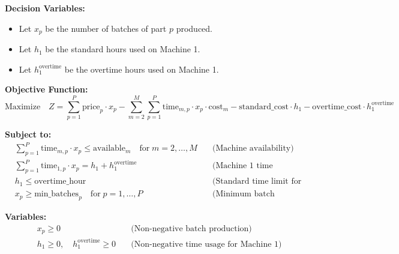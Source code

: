 \documentclass{article}
\begin{document}
\textbf{Decision Variables:}
\begin{itemize}
    \item Let $x_p$ be the number of batches of part $p$ produced.
    \item Let $h_1$ be the standard hours used on Machine 1.
    \item Let $h_1^{\text{overtime}}$ be the overtime hours used on Machine 1.
\end{itemize}

\textbf{Objective Function:}
\[
\text{Maximize} \quad Z = \sum_{p=1}^{P} \text{price}_p \cdot x_p - \sum_{m=2}^{M} \sum_{p=1}^{P} \text{time}_{m,p} \cdot x_p \cdot \text{cost}_m - \text{standard_cost} \cdot h_1 - \text{overtime_cost} \cdot h_1^{\text{overtime}}
\]

\textbf{Subject to:}
\begin{align*}
    &\sum_{p=1}^{P} \text{time}_{m,p} \cdot x_p \leq \text{available}_{m} \quad \text{for} \; m = 2, \ldots, M \quad &\text{(Machine availability)}\\
    &\sum_{p=1}^{P} \text{time}_{1,p} \cdot x_p = h_1 + h_1^{\text{overtime}} \quad &\text{(Machine 1 time allocation)}\\
    &h_1 \leq \text{overtime_hour} \quad &\text{(Standard time limit for Machine 1)}\\
    &x_p \geq \text{min_batches}_{p} \quad \text{for} \; p = 1, \ldots, P \quad &\text{(Minimum batch requirement)}
\end{align*}

\textbf{Variables:}
\begin{align*}
    &x_p \geq 0 \quad &\text{(Non-negative batch production)}\\
    &h_1 \geq 0, \quad h_1^{\text{overtime}} \geq 0 \quad &\text{(Non-negative time usage for Machine 1)}
\end{align*}
\end{document}
